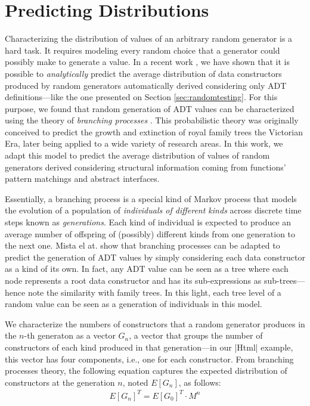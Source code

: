 \section{Predicting Distributions} \label{sec:synthesis}

Characterizing the distribution of values of an arbitrary random generator is a
hard task.
%
It requires modeling every random choice that a generator could possibly make to
generate a value.
%
In a recent work \cite{DBLP:conf/haskell/MistaRH18}, we have shown that it is
possible to \emph{analytically} predict the average distribution of data
constructors produced by random generators automatically derived considering
only ADT definitions---like the one presented on Section
\ref{sec:randomtesting}.
%
For this purpose, we found that random generation of ADT values can be
characterized using the theory of \emph{branching processes} \cite{gw1875}.
%
This probabilistic theory was originally conceived to predict the growth and
extinction of royal family trees the Victorian Era, later being applied to a
wide variety of research areas.
%
In this work, we adapt this model to predict the average distribution of values
of random generators derived considering structural information coming from
functions' pattern matchings and abstract interfaces.

Essentially, a branching process is a special kind of Markov process that models
the evolution of a population of \emph{individuals of different kinds} across
discrete time steps known as \emph{generations}.
%
Each kind of individual is expected to produce an average number of offspring of
(possibly) different kinds from one generation to the next one.
%
Mista el at. \cite{DBLP:conf/haskell/MistaRH18} show that branching processes
can be adapted to predict the generation of ADT values by simply considering
each data constructor as a kind of its own.
%
In fact, any ADT value can be seen as a tree where each node represents a root
data constructor and has its sub-expressions as sub-trees---hence note the
similarity with family trees.
%
In this light, each tree level of a random value can be seen as a generation of
individuals in this model.


We characterize the numbers of constructors that a random generator produces in
the $n$-th generaton as a vector $G_n$, a vector that groups the number of
constructors of each kind produced in that generation---in our |Html| example,
this vector has four components, i.e., one for each constructor.
%
%
From branching processes theory, the following equation captures the expected
distribution of constructors at the generation $n$, noted $E[G_n]$, as follows:
%
\begin{align}
  E[G_n]^T = E[G_0]^T \cdot M^n
  \label{eqn:prediction}
\end{align}

